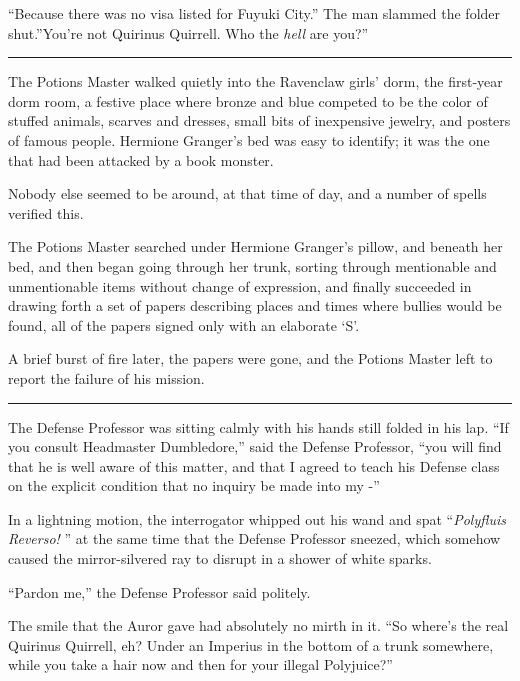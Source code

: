 ``Because there was no visa listed for Fuyuki City.'' The man slammed
the folder shut.''You're not Quirinus Quirrell. Who the \emph{hell} are
you?''

\begin{center}\rule{3in}{0.4pt}\end{center}

The Potions Master walked quietly into the Ravenclaw girls' dorm, the
first-year dorm room, a festive place where bronze and blue competed to
be the color of stuffed animals, scarves and dresses, small bits of
inexpensive jewelry, and posters of famous people. Hermione Granger's
bed was easy to identify; it was the one that had been attacked by a
book monster.

Nobody else seemed to be around, at that time of day, and a number of
spells verified this.

The Potions Master searched under Hermione Granger's pillow, and beneath
her bed, and then began going through her trunk, sorting through
mentionable and unmentionable items without change of expression, and
finally succeeded in drawing forth a set of papers describing places and
times where bullies would be found, all of the papers signed only with
an elaborate `S'.

A brief burst of fire later, the papers were gone, and the Potions
Master left to report the failure of his mission.

\begin{center}\rule{3in}{0.4pt}\end{center}

The Defense Professor was sitting calmly with his hands still folded in
his lap. ``If you consult Headmaster Dumbledore,'' said the Defense
Professor, ``you will find that he is well aware of this matter, and
that I agreed to teach his Defense class on the explicit condition that
no inquiry be made into my -''

In a lightning motion, the interrogator whipped out his wand and spat
``\emph{Polyfluis Reverso!} '' at the same time that the Defense Professor
sneezed, which somehow caused the mirror-silvered ray to disrupt in a
shower of white sparks.

``Pardon me,'' the Defense Professor said politely.

The smile that the Auror gave had absolutely no mirth in it. ``So
where's the real Quirinus Quirrell, eh? Under an Imperius in the bottom
of a trunk somewhere, while you take a hair now and then for your
illegal Polyjuice?''

